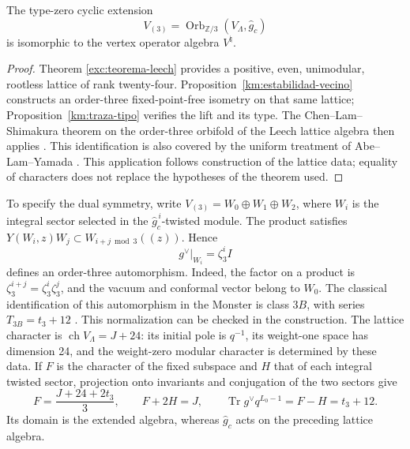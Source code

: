 \begin{theorem}
\label{km:moonshine-tres}
The type-zero cyclic extension
\begin{equation}
 V_{(3)}=\operatorname{Orb}_{\mathbb Z/3}
                 (V_\Lambda,\widehat g_c)
 \label{km:extension-orden3}
\end{equation}
is isomorphic to the vertex operator algebra \(V^\natural\).
\end{theorem}
\begin{proof}
Theorem \ref{exc:teorema-leech} provides a positive,
even, unimodular, rootless lattice of rank twenty-four.
Proposition~\ref{km:estabilidad-vecino} constructs an order-three
fixed-point-free isometry on that same lattice;
Proposition~\ref{km:traza-tipo} verifies the lift and its type.
The Chen--Lam--Shimakura theorem on the order-three orbifold
of the Leech lattice algebra then applies
\cite{chenlamshimakura2016}. This identification is also covered
by the uniform treatment of Abe--Lam--Yamada
\cite{abelamyamada2017}. This application follows construction
of the lattice data; equality of characters does not replace the
hypotheses of the theorem used.
\end{proof}

To specify the dual symmetry, write
\(V_{(3)}=W_0\oplus W_1\oplus W_2\), where \(W_i\) is the
integral sector selected in the \(\widehat g_c^{\,i}\)-twisted module.
The product satisfies
\(Y(W_i,z)W_j\subset W_{i+j\bmod3}((z))\). Hence
\begin{equation}
 g^\vee|_{W_i}=\zeta_3^i I
 \label{km:dual-ciclico}
\end{equation}
defines an order-three automorphism. Indeed, the factor on a
product is \(\zeta_3^{i+j}=\zeta_3^i\zeta_3^j\), and the vacuum and
conformal vector belong to \(W_0\). The classical identification of
this automorphism in the Monster is class \(3B\), with series
\(T_{3B}=t_3+12\) \cite{kmconwaynorton1979,borcherds}.
This normalization can be checked in the construction. The lattice
character is \(\operatorname{ch}V_\Lambda=J+24\): its initial pole
is \(q^{-1}\), its weight-one space has dimension 24, and the
weight-zero modular character is determined by these data.
If \(F\) is the character of the fixed subspace and \(H\) that of each
integral twisted sector, projection onto invariants and conjugation
of the two sectors give
\[
 F=\frac{J+24+2t_3}{3},\qquad F+2H=J,
 \qquad \operatorname{Tr}g^\vee q^{L_0-1}=F-H=t_3+12.
\]
Its domain is the extended algebra, whereas
\(\widehat g_c\) acts on the preceding lattice algebra.

